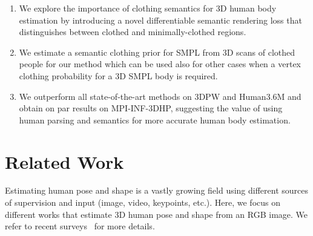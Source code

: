 \documentclass[10pt,twocolumn,letterpaper]{article}
\begin{document}
\begin{enumerate}[noitemsep, topsep=1pt]
    \item We explore the importance of clothing semantics for 3D human body estimation by introducing a novel differentiable semantic rendering loss that distinguishes between clothed and minimally-clothed regions.
    \item We estimate a semantic clothing prior for SMPL from 3D scans of clothed people for our method which can be used also for other cases when a vertex clothing probability for a 3D SMPL body is required.
    \item We outperform all state-of-the-art methods on 3DPW and Human3.6M and obtain on par results on MPI-INF-3DHP, suggesting the value of using human parsing and semantics for more accurate human body estimation.
\end{enumerate} \section{Related Work}
Estimating human pose and shape is a vastly growing field using different sources of supervision and input (image, video, keypoints, etc.). Here, we focus on different works that estimate 3D human pose and shape from an RGB image. We refer to recent surveys~\cite{Chen2020MonocularHP,SARAFIANOS20161} for more details.
\end{document}
